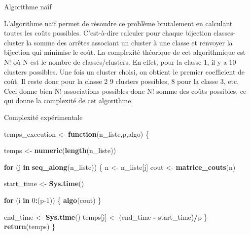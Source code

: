 \documentclass[
  ignorenonframetext,
]{beamer}
\newenvironment{Shaded}{\begin{snugshade}}{\end{snugshade}}
\newcommand{\ControlFlowTok}[1]{\textcolor[rgb]{0.13,0.29,0.53}{\textbf{#1}}}
\newcommand{\DecValTok}[1]{\textcolor[rgb]{0.00,0.00,0.81}{#1}}
\newcommand{\FunctionTok}[1]{\textcolor[rgb]{0.13,0.29,0.53}{\textbf{#1}}}
\newcommand{\NormalTok}[1]{#1}
\newcommand{\OtherTok}[1]{\textcolor[rgb]{0.56,0.35,0.01}{#1}}
\newcommand{\SpecialCharTok}[1]{\textcolor[rgb]{0.81,0.36,0.00}{\textbf{#1}}}
\begin{document}
\begin{frame}{}
\protect\hypertarget{section-9}{}
Algorithme naîf

L'algorithme naîf permet de résoudre ce problème brutalement en
calculant toutes les coûts possibles. C'est-à-dire calculer pour chaque
bijection classes-cluster la somme des arrêtes associant un cluster à
une classe et renvoyer la bijection qui minimise le coût. La complexité
théorique de cet algorithmique est N! où N est le nombre de
classes/clusters. En effet, pour la classe 1, il y a 10 clusters
possibles. Une fois un cluster choisi, on obtient le premier coefficient
de coût. Il reste donc pour la classe 2 9 clusters possibles, 8 pour la
classe 3, etc. Ceci donne bien N! associations possibles donc N! somme
des coûts possibles, ce qui donne la complexité de cet algorithme.
\end{frame}

\begin{frame}[fragile]{}
\protect\hypertarget{section-10}{}
Complexité expérimentale

\begin{Shaded}
\begin{Highlighting}[]
\NormalTok{temps\_execution }\OtherTok{\textless{}{-}} \ControlFlowTok{function}\NormalTok{(n\_liste,p,algo) \{}

\NormalTok{  temps }\OtherTok{\textless{}{-}} \FunctionTok{numeric}\NormalTok{(}\FunctionTok{length}\NormalTok{(n\_liste))}
  
  \ControlFlowTok{for}\NormalTok{ (j }\ControlFlowTok{in} \FunctionTok{seq\_along}\NormalTok{(n\_liste)) \{}
\NormalTok{    n }\OtherTok{\textless{}{-}}\NormalTok{ n\_liste[j]}
\NormalTok{    cout }\OtherTok{\textless{}{-}} \FunctionTok{matrice\_couts}\NormalTok{(n)}
    
\NormalTok{    start\_time }\OtherTok{\textless{}{-}} \FunctionTok{Sys.time}\NormalTok{()}
    
    \ControlFlowTok{for}\NormalTok{ (i }\ControlFlowTok{in} \DecValTok{0}\SpecialCharTok{:}\NormalTok{(p}\DecValTok{{-}1}\NormalTok{)) \{}
    \FunctionTok{algo}\NormalTok{(cout)}
\NormalTok{    \}}
    
\NormalTok{    end\_time }\OtherTok{\textless{}{-}} \FunctionTok{Sys.time}\NormalTok{()}
\NormalTok{    temps[j] }\OtherTok{\textless{}{-}}\NormalTok{ (end\_time }\SpecialCharTok{{-}}\NormalTok{ start\_time)}\SpecialCharTok{/}\NormalTok{p}
\NormalTok{  \}}
  \FunctionTok{return}\NormalTok{(temps)}
\NormalTok{\}}
\end{Highlighting}
\end{Shaded}
\end{frame}
\end{document}
